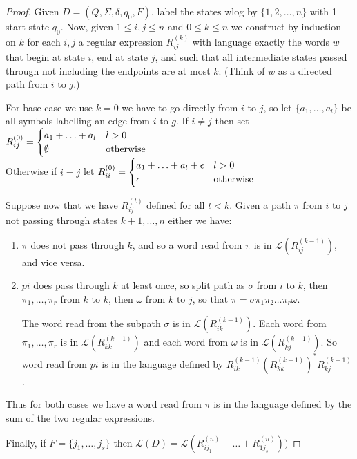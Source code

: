 \documentclass[10pt,a4paper]{article}
\begin{document}
\begin{proof}
Given $D = (Q, \Sigma, \delta, q_0, F)$, label the states wlog by $\{1, 2, \ldots, n\}$ with 1 start state $q_0$. Now, given $1 \leq i,j \leq n$ and $0 \leq k \leq n$ we construct by induction on $k$ for each $i,j$ a regular expression $R^{(k)}_{ij}$ with language exactly the words $w$ that begin at state $i$, end at state $j$, and such that all intermediate states passed through not including the endpoints are at most $k$. (Think of $w$ as a directed path from $i$ to $j$.)

For base case we use $k=0$ we have to go directly from $i$ to $j$, so let $\{a_1, \ldots, a_l\}$ be all symbols labelling an edge from $i$ to $g$. If $i \neq j$ then set $R^{(0)}_{ij} = \begin{cases} a_1 + \ldots + a_l & l>0 \\ \emptyset & \text{otherwise} \end{cases}$\\
Otherwise if $i=j$ let $R^{(0)}_{ii} = \begin{cases} a_1 + \ldots + a_l + \epsilon & l>0 \\ \epsilon & \text{otherwise} \end{cases}$

Suppose now that we have $R^{(t)}_{ij}$ defined for all $t < k$. Given a path $\pi$ from $i$ to $j$ not passing through states $k+1, \ldots, n$ either we have:
\begin{enumerate}
\item $\pi$ does not pass through $k$, and so a word read from $\pi$ is in $\mathcal{L}(R_{ij}^{(k-1)})$, and vice versa.
\item $pi$ does pass through $k$ at least once, so split path as $\sigma$ from $i$ to $k$, then $\pi_1, \ldots, \pi_r$ from $k$ to $k$, then $\omega$ from $k$ to $j$, so that $\pi = \sigma\pi_1 \pi_2 \ldots \pi_r \omega$.

The word read from the subpath $\sigma$ is in $\mathcal{L}(R^{(k-1)}_{ik})$. Each word from $\pi_1, \ldots, \pi_r$ is in $\mathcal{L}(R^{(k-1)}_{kk})$ and each word from $\omega$ is in $\mathcal{L}(R^{(k-1)}_{kj})$. So word read from $pi$ is in the language defined by $R^{(k-1)}_{ik}(R^{(k-1)}_{kk})^\ast R^{(k-1)}_{kj}$.
\end{enumerate}
Thus for both cases we have a word read from $\pi$ is in the language defined by the sum of the two regular expressions.

Finally, if $F = \{j_1, \ldots, j_s\}$ then $\mathcal{L}(D) = \mathcal{L}(R_{ij_1}^{(n)} + \ldots + R_{1j_s}^{(n)}))$
\end{proof}
\end{document}
